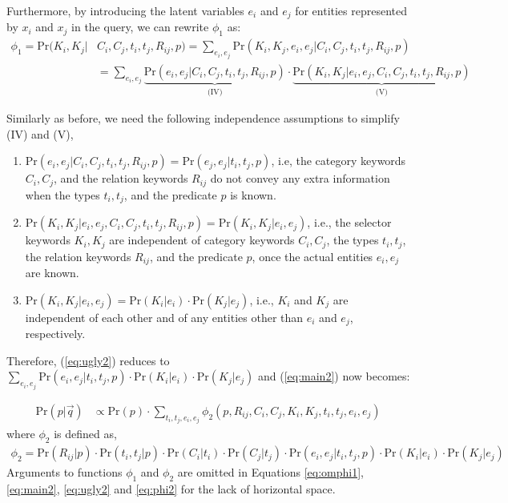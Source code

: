 \documentclass[a4paper, twoside, 12pt]{report}
\begin{document}
Furthermore, by introducing the latent variables $e_i$ and $e_j$ for entities represented by $x_i$ and $x_j$ in the query, we can rewrite $\phi_1$ as:
\begin{align}
\phi_1 = \text{Pr}(K_i,K_j|&C_i,C_j,t_i, t_j,R_{ij},p) = \sum_{e_i,e_j}\text{Pr}(K_i,K_j,e_i,e_j|C_i,C_j,t_i,t_j,R_{ij},p) \\
&= \sum_{e_i,e_j} \underbrace{\text{Pr}(e_i,e_j|C_i,C_j,t_i,t_j,R_{ij},p)}_\text{(IV)} \cdot \underbrace{\text{Pr}(K_i,K_j|e_i,e_j,C_i,C_j,t_i,t_j,R_{ij},p)}_\text{(V)} \label{eq:ugly2}
\end{align}

Similarly as before, we need the following independence assumptions to simplify (IV) and (V),
\begin{enumerate}
\item $\text{Pr}(e_i,e_j|C_i,C_j,t_i,t_j,R_{ij},p) = \text{Pr}(e_j,e_j|t_i,t_j,p)$, i.e, the category keywords $C_i,C_j$, and the relation keywords $R_{ij}$ do not convey any extra information when the types $t_i,t_j$, and the predicate $p$ is known.

\item $\text{Pr}(K_i,K_j|e_i,e_j,C_i,C_j,t_i,t_j,R_{ij},p) = \text{Pr}(K_i,K_j|e_i,e_j)$, i.e., the selector keywords $K_i,K_j$ are independent of category keywords $C_i,C_j$, the types $t_i,t_j$, the relation keywords $R_{ij}$, and the predicate $p$, once the actual entities $e_i,e_j$ are known.

\item $\text{Pr}(K_i,K_j|e_i,e_j) = \text{Pr}(K_i|e_i)\cdot \text{Pr}(K_j|e_j)$, i.e., $K_i$ and $K_j$ are independent of each other and of any entities other than $e_i$ and $e_j$, respectively.
\end{enumerate}

Therefore, (\ref{eq:ugly2}) reduces to $\sum_{e_i,e_j} \text{Pr}(e_i,e_j|t_i,t_j,p) \cdot \text{Pr}(K_i|e_i) \cdot \text{Pr}(K_j|e_j)$ and (\ref{eq:main2}) now becomes:

\begin{align}
\text{Pr}(p|\vec{q})& \propto \text{Pr}(p) \cdot \sum_{t_i,t_j,e_i,e_j} \phi_2(p, R_{ij}, C_i, C_j, K_i, K_j, t_i, t_j, e_i, e_j) \label{eq:main3}
\end{align}
where $\phi_2$ is defined as,
\begin{align}
\phi_2 = \text{Pr}(R_{ij}|p) \cdot \text{Pr}(t_i,t_j|p) \cdot \text{Pr}(C_i|t_i) \cdot \text{Pr}(C_j|t_j) \cdot \text{Pr}(e_i,e_j|t_i,t_j,p) \cdot \text{Pr}(K_i|e_i) \cdot \text{Pr}(K_j|e_j) \label{eq:phi2}
\end{align}
Arguments to functions $\phi_1$ and $\phi_2$ are omitted in Equations \ref{eq:omphi1}, \ref{eq:main2}, \ref{eq:ugly2} and \ref{eq:phi2}  for the lack of horizontal space.
\end{document}

